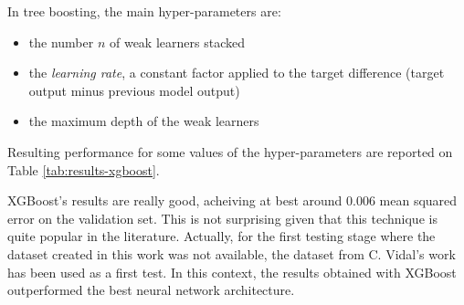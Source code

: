 In tree boosting, the main hyper-parameters are:
\begin{itemize}
    \item the number $n$ of weak learners stacked
    \item the \textit{learning rate}, a constant factor applied to the target difference (target output minus previous model output)
    \item the maximum depth of the weak learners
\end{itemize}

Resulting performance for some values of the hyper-parameters are reported on Table \ref{tab:results-xgboost}.

XGBoost's results are really good, acheiving at best around 0.006 mean squared error on the validation set. This is not surprising given that this technique is quite popular in the literature. Actually, for the first testing stage where the dataset created in this work was not available, the dataset from C. Vidal's work has been used as a first test. In this context, the results obtained with XGBoost outperformed the best neural network architecture.

